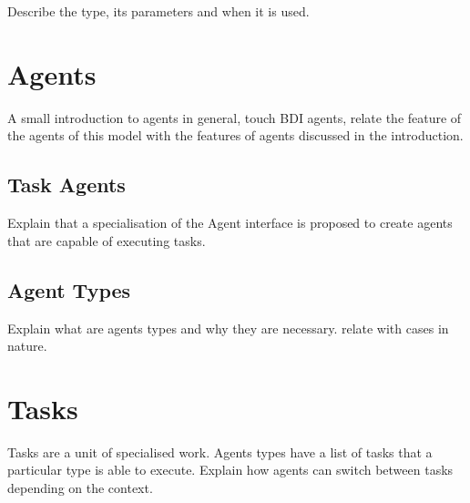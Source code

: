 Describe the type, its parameters and when it is used.

\section {Agents}

A small introduction to agents in general, touch BDI agents, relate the feature of the agents of this model with the features of agents discussed in the introduction.

\subsection{Task Agents}

Explain that a specialisation of the Agent interface is proposed to create agents that are capable of executing tasks.

\subsection{Agent Types}

Explain what are agents types and why they are necessary. relate with cases in nature.

\section {Tasks}

Tasks are a unit of specialised work. Agents types have a list of tasks that a particular type is able to execute. Explain how agents can switch between tasks depending on the context.